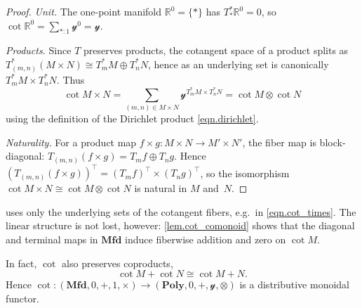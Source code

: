 \documentclass[11pt, oneside, article]{memoir}
\theoremstyle{definition}
\theoremstyle{plain}
\newenvironment{remark}
  {\pushQED{\qed}\renewcommand{\qedsymbol}{$\lozenge$}\remarkx}
  {\popQED\endremarkx}
\newcommand{\Cat}[1]{\mathbf{#1}}%
\newcommand{\yon}{\mathcal{y}}
\newcommand{\poly}{\Cat{Poly}}
\newcommand{\mfd}{\Cat{Mfd}}
\begin{document}
\begin{proof}
\textit{Unit.} The one-point manifold $\mathbb{R}^0=\{*\}$ has $T^*_*\mathbb{R}^0=0$, so $\cot{\mathbb{R}^0}=\sum_{*:1}\yon^0=\yon$.

\textit{Products.} Since $T$ preserves products, the cotangent space of a product splits as $T^*_{(m,n)}(M\times N)\cong T^*_mM\oplus T^*_nN$, hence as an underlying set is canonically $T^*_mM\times T^*_nN$. Thus
\begin{equation}\label{eqn.cot_times}
\cot{M\times N}=\sum_{(m,n)\in M\times N}\yon^{T^*_mM\times T^*_nN}=\cot{M}\otimes\cot{N}
\end{equation}
using the definition of the Dirichlet product \eqref{eqn.dirichlet}.

\textit{Naturality.} For a product map $f\times g\colon M\times N\to M'\times N'$, the fiber map is block-diagonal: $T_{(m,n)}(f\times g)=T_m f\oplus T_n g$. Hence $(T_{(m,n)}(f\times g))^\top=(T_m f)^\top\times(T_n g)^\top$, so the isomorphism $\cot{M\times N}\cong\cot{M}\otimes\cot{N}$ is natural in $M$ and~$N$.
%
\end{proof}

 uses only the underlying sets of the cotangent fibers, e.g.\ in \eqref{eqn.cot_times}. The linear structure is not lost, however: \cref{lem.cot_comonoid} shows that the diagonal and terminal maps in $\mfd$ induce fiberwise addition and zero on $\cot{M}$.

\begin{remark}
In fact, $\cot$ also preserves coproducts,
\[
\cot{M}+\cot{N}\cong\cot{M+N}.
\]
Hence $\cot\colon(\mfd,0,+,1,\times)\to(\poly,0,+,\yon,\otimes)$ is a distributive monoidal functor.
\end{remark}
\end{document}
